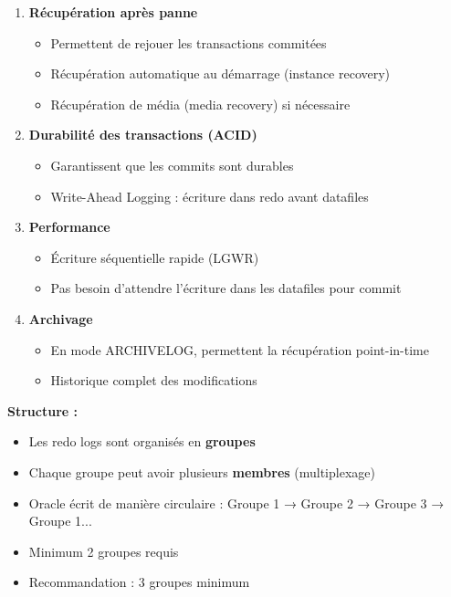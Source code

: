 \documentclass[11pt,a4paper]{article}
\begin{document}
\begin{enumerate}
    \item \textbf{Récupération après panne}
    \begin{itemize}
        \item Permettent de rejouer les transactions commitées
        \item Récupération automatique au démarrage (instance recovery)
        \item Récupération de média (media recovery) si nécessaire
    \end{itemize}
    
    \item \textbf{Durabilité des transactions (ACID)}
    \begin{itemize}
        \item Garantissent que les commits sont durables
        \item Write-Ahead Logging : écriture dans redo avant datafiles
    \end{itemize}
    
    \item \textbf{Performance}
    \begin{itemize}
        \item Écriture séquentielle rapide (LGWR)
        \item Pas besoin d'attendre l'écriture dans les datafiles pour commit
    \end{itemize}
    
    \item \textbf{Archivage}
    \begin{itemize}
        \item En mode ARCHIVELOG, permettent la récupération point-in-time
        \item Historique complet des modifications
    \end{itemize}
\end{enumerate}

\textbf{Structure :}

\begin{itemize}
    \item Les redo logs sont organisés en \textbf{groupes}
    \item Chaque groupe peut avoir plusieurs \textbf{membres} (multiplexage)
    \item Oracle écrit de manière circulaire : Groupe 1 → Groupe 2 → Groupe 3 → Groupe 1...
    \item Minimum 2 groupes requis
    \item Recommandation : 3 groupes minimum
\end{itemize}
\end{document}
